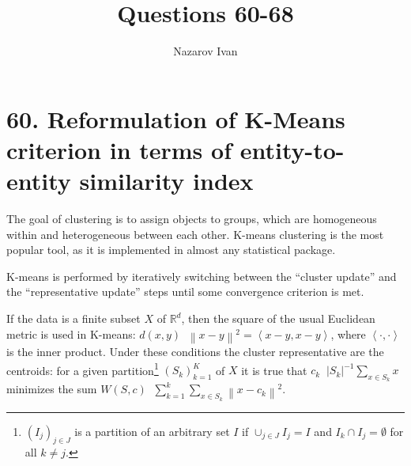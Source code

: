 \documentclass[a4paper]{article}
\title{Questions 60-68}
\author{Nazarov Ivan}
\newcommand{\brac}[1]{{\left ( #1 \right )}}
\newcommand{\abs}[1]{{\left | #1 \right |}}
\newcommand{\nrm}[1]{{\left\| #1 \right \|}}
\newcommand{\brkt}[1]{{\left\langle #1 \right\rangle}}
\newcommand{\Real}{\mathbb{R}}
\newcommand{\defn}{\mathop{\overset{\Delta}{=}}\nolimits}
\begin{document}
\maketitle

% 
% 
% 

\section*{60. Reformulation of K-Means criterion in terms of entity-to-entity similarity index} %
\label{sec:question_60}
The goal of clustering is to assign objects to groups, which are homogeneous within and heterogeneous between each other. K-means clustering is the most popular tool, as it is implemented in almost any statistical package.

K-means is performed by iteratively switching between the ``cluster update'' and the ``representative update'' steps until some convergence criterion is met.

If the data is a finite subset $X$ of $\Real^d$, then the square of the usual Euclidean metric is used in K-means: $d(x,y)\defn \nrm{x-y}^2 = \brkt{x-y,x-y}$, where $\brkt{\cdot,\cdot}$ is the inner product. Under these conditions the cluster representative are the centroids: for a given partition\footnote{$\brac{I_j}_{j\in J}$ is a partition of an arbitrary set $I$ if $\cup_{j\in J} I_j = I$ and $I_k\cap I_j=\emptyset$ for all $k\neq j$.} $\brac{S_k}_{k=1}^K$ of $X$ it is true that $c_k\defn \abs{S_k}^{-1}\sum_{x\in S_k} x$ minimizes the sum $W\brac{S,c} \defn \sum_{k=1}^k \sum_{x\in S_k} \nrm{x-c_k}^2$. %
\end{document}
